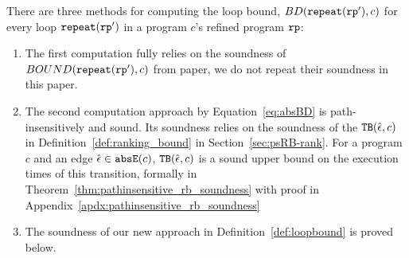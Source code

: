 
There are three methods for computing the loop bound, $BD(\mathtt{repeat}(\mathtt{rp}'), c)$ for every loop $\mathtt{repeat}(\mathtt{rp}')$ in a program $c$'s refined program $\mathtt{rp}$:
\begin{enumerate}
  \item The first computation fully relies on the soundness of $BOUND(\mathtt{repeat}(\mathtt{rp}'), c)$ from paper\cite{GulwaniJK09}, we do not repeat their soundness in this paper.
  \item The second computation approach by Equation~\ref{eq:absBD} is path-insensitively and sound.
    Its soundness relies on the soundness of the ${\mathtt{TB}}(\hat{\mathtt{\epsilon}{}}, c)$ in Definition~\ref{def:ranking_bound} in Section~\ref{sec:psRB-rank}.
    For a program $c$ and an edge $\hat{\mathtt{\epsilon}{}} \in \mathtt{abs}{\mathtt{E}}(c)$, ${\mathtt{TB}}(\hat{\mathtt{\epsilon}{}}, c)$ is a sound upper bound on the execution times of this transition, formally in Theorem~\ref{thm:pathinsensitive_rb_soundness} with proof in Appendix~\ref{apdx:pathinsensitive_rb_soundness}    
    \item  The soundness of our new approach in Definition~\ref{def:loopbound} is proved below.
  \end{enumerate}

